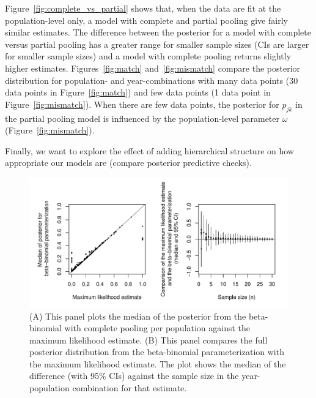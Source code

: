 \documentclass[12pt, oneside, titlepage]{article}   	%
\begin{document}
Figure~\ref{fig:complete_vs_partial} shows that, when the data are fit at the population-level only, a model with complete and partial pooling give fairly similar estimates. The difference between the posterior for a model with complete versus partial pooling has a greater range for smaller sample sizes (CIs are larger for smaller sample sizes) and a model with complete pooling returns slightly higher estimates. Figures~\ref{fig:match} and~\ref{fig:mismatch} compare the posterior distribution for population- and year-combinations with many data points (30 data points in Figure~\ref{fig:match}) and few data points (1 data point in Figure~\ref{fig:mismatch}). When there are few data points, the posterior for $p_{jk}$ in the partial pooling model is influenced by the population-level parameter $\omega$ (Figure~\ref{fig:mismatch}).

Finally, we want to explore the effect of adding hierarchical structure on how appropriate our models are (compare posterior predictive checks).



\clearpage

 \begin{figure}[h]
   \centering
       \includegraphics[page=1,width=.9\textwidth]{../figures/appendix-x-mle_bayes}  
    \caption{ (A) This panel plots the median of the posterior from the beta-binomial with complete pooling per population against the maximum likelihood estimate. (B) This panel compares the full posterior distribution from the beta-binomial parameterization with the maximum likelihood estimate. The plot shows the median of the difference (with 95\% CIs) against the sample size in the year-population combination for that estimate.  }
 \label{fig:mle_bayes}
\end{figure}
\end{document}
